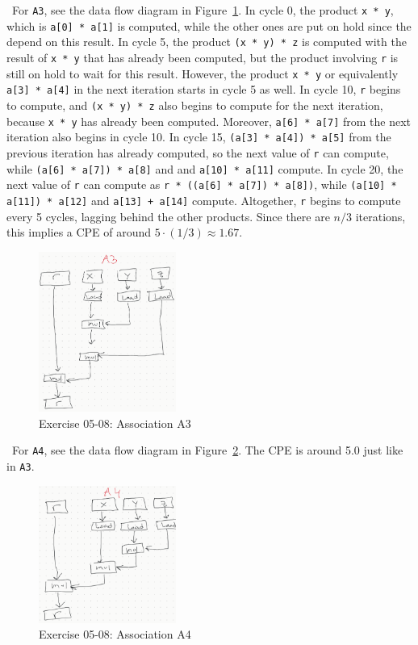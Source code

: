 \documentclass[12pt]{article}
\newenvironment{sol}[1][Solution]{\begin{trivlist}
		\item[\hskip \labelsep {\bfseries #1:}]}{\end{trivlist}}
\begin{document}
\begin{sol}
	\
	For \texttt{A3}, see the data flow diagram in Figure~\ref{fig:ex-05-08-a3}. In cycle 0,
	the product \texttt{x * y}, which is \texttt{a[0] * a[1]} is computed, while the other ones
	are put on hold since the depend on this result. In cycle 5, the product \texttt{(x * y) * z}
	is computed with the result of \texttt{x * y} that has already been computed, but the
	product involving \texttt{r} is still on hold to wait for this result. However, the
	product \texttt{x * y} or equivalently \texttt{a[3] * a[4]} in the next iteration starts
	in cycle 5 as well. In cycle 10, \texttt{r} begins to compute, and \texttt{(x * y) * z}
	also begins to compute for the next iteration, because \texttt{x * y} has already been
	computed. Moreover, \texttt{a[6] * a[7]} from the next iteration also begins in cycle 10. In cycle 15, \texttt{(a[3] * a[4]) * a[5]} from the previous iteration has already computed, so
	the next value of \texttt{r} can compute, while \texttt{(a[6] * a[7]) * a[8]} and
	and \texttt{a[10] * a[11]} compute. In cycle 20, the next value of \texttt{r} can compute
	as \texttt{r * ((a[6] * a[7]) * a[8])}, while \texttt{(a[10] * a[11]) * a[12]} and
	\texttt{a[13] + a[14]} compute. Altogether, \texttt{r} begins to compute every 5 cycles, 
	lagging behind the other products. Since there are $n/3$ iterations, this implies
	a CPE of around $5\cdot (1/3)\approx 1.67$.
	\begin{figure}
		\centering
		\includegraphics[width=0.4\textwidth]{exercise-05-08-a3.png}
		\caption{Exercise 05-08: Association A3}
		\label{fig:ex-05-08-a3}
	\end{figure}
	
	\
	For \texttt{A4}, see the data flow diagram in Figure~\ref{fig:ex-05-08-a4}. The
	CPE is around 5.0 just like in \texttt{A3}.
	\begin{figure}
		\centering
		\includegraphics[width=0.4\textwidth]{exercise-05-08-a4.png}
		\caption{Exercise 05-08: Association A4}
		\label{fig:ex-05-08-a4}
	\end{figure}


\end{sol}
\end{document}
